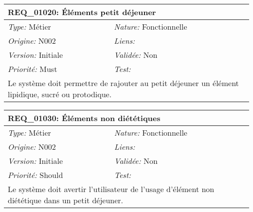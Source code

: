 \begin{table}[!ht]

\begin{tabular}{|p{60mm}p{100mm}|}

\hline

\multicolumn{2}{|l|}{\textbf{REQ\_01020:} Éléments petit déjeuner} \\ \hline

\emph{Type:} Métier & \emph{Nature:} Fonctionnelle \\

\emph{Origine:} N002 & \emph{Liens:}  \\

\emph{Version:} Initiale & \emph{Validée:} Non \\

\emph{Priorité:} Must & \emph{Test:} \\ \hline

\multicolumn{2}{|p{16cm}|}{Le système doit permettre de rajouter au petit déjeuner un élément lipidique, sucré ou protodique.} \\ \hline

\end{tabular}

\end{table}



\begin{table}[!ht]

\begin{tabular}{|p{60mm}p{100mm}|}

\hline

\multicolumn{2}{|l|}{\textbf{REQ\_01030:} Éléments non diététiques} \\ \hline

\emph{Type:} Métier & \emph{Nature:} Fonctionnelle \\

\emph{Origine:} N002 & \emph{Liens:}  \\

\emph{Version:} Initiale & \emph{Validée:} Non \\

\emph{Priorité:} Should & \emph{Test:} \\ \hline

\multicolumn{2}{|p{16cm}|}{Le système doit avertir l'utilisateur de l'usage d'élément non diététique dans un petit déjeuner.} \\ \hline

\end{tabular}

\end{table}



